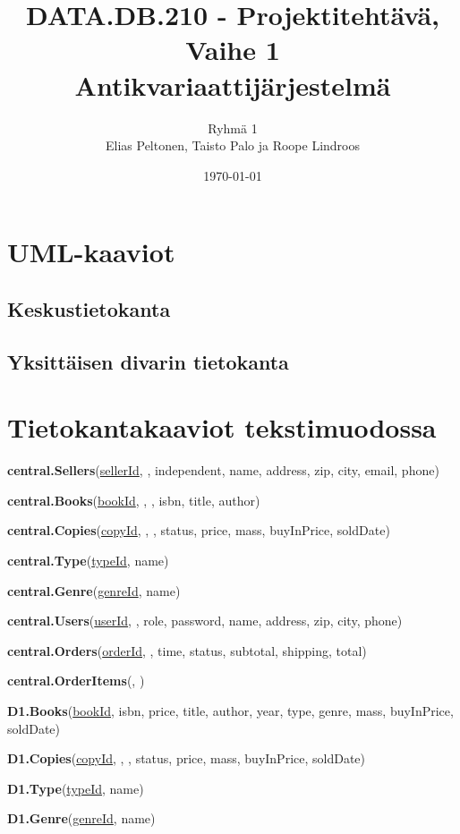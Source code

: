 \documentclass[11pt,a4paper]{article}
\title{DATA.DB.210 - Projektitehtävä, Vaihe 1 \\ \large Antikvariaattijärjestelmä}
\author{Ryhmä 1 \\ \small Elias Peltonen, Taisto Palo ja Roope Lindroos}
\date{\today}
\begin{document}
\maketitle
\newpage

\tableofcontents
\newpage

\section{UML-kaaviot}

\subsection{Keskustietokanta}



\subsection{Yksittäisen divarin tietokanta}



\section{Tietokantakaaviot tekstimuodossa}

{\small{
	\textbf{central.Sellers}(\underline{sellerId}, , independent, name, address, zip, city, email, phone)
	
	\textbf{central.Books}(\underline{bookId}, , , isbn, title, author)
	
	\textbf{central.Copies}(\underline{copyId}, , , status, price, mass, buyInPrice, soldDate)

	\textbf{central.Type}(\underline{typeId}, name)

	\textbf{central.Genre}(\underline{genreId}, name)

	\textbf{central.Users}(\underline{userId}, , role, password, name, address, zip, city, phone)
	
	\textbf{central.Orders}(\underline{orderId}, , time, status, subtotal, shipping, total)
	
	\textbf{central.OrderItems}(, )
	
	\textbf{D1.Books}(\underline{bookId}, isbn, price, title, author, year, type, genre, mass, buyInPrice, soldDate)

	\textbf{D1.Copies}(\underline{copyId}, , , status, price, mass, buyInPrice, soldDate)

	\textbf{D1.Type}(\underline{typeId}, name)

	\textbf{D1.Genre}(\underline{genreId}, name)
}}
\end{document}
